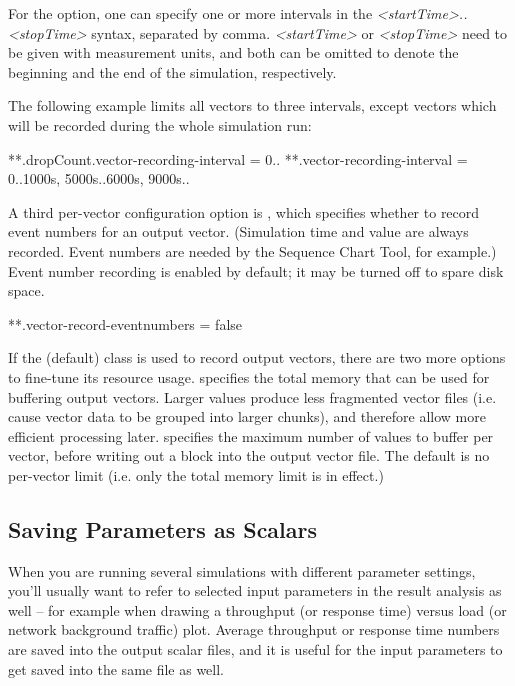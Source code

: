 For the  option, one can specify
one or more intervals in the \textit{<startTime>..<stopTime>} syntax,
separated by comma. \textit{<startTime>} or \textit{<stopTime>} need
to be given with measurement units, and both can be omitted to denote
the beginning and the end of the simulation, respectively.

The following example limits all vectors to three intervals, except
 vectors which will be recorded during the whole
simulation run:

\begin{inifile}
**.dropCount.vector-recording-interval = 0..
**.vector-recording-interval = 0..1000s, 5000s..6000s, 9000s..
\end{inifile}

A third per-vector configuration option is ,
which specifies whether to record event numbers for an output vector.
(Simulation time and value are always recorded. Event numbers are needed
by the Sequence Chart Tool, for example.) Event number recording is enabled
by default; it may be turned off to spare disk space.

\begin{inifile}
**.vector-record-eventnumbers = false
\end{inifile}

If the (default)  class is used to
record output vectors, there are two more options to fine-tune its resource
usage.  specifies the total memory that
can be used for buffering output vectors. Larger values produce less
fragmented vector files (i.e. cause vector data to be grouped into larger
chunks), and therefore allow more efficient processing later.
 specifies the maximum number of values to
buffer per vector, before writing out a block into the output vector file.
The default is no per-vector limit (i.e. only the total memory limit is in
effect.)


\subsection{Saving Parameters as Scalars}

When you are running several simulations with different parameter
settings, you'll usually want to refer to selected
input parameters in the result analysis as well -- for example when
drawing a throughput (or response time) versus load (or network
background traffic) plot. Average throughput or response time numbers
are saved into the output scalar files, and it is useful for the input
parameters to get saved into the same file as well.

